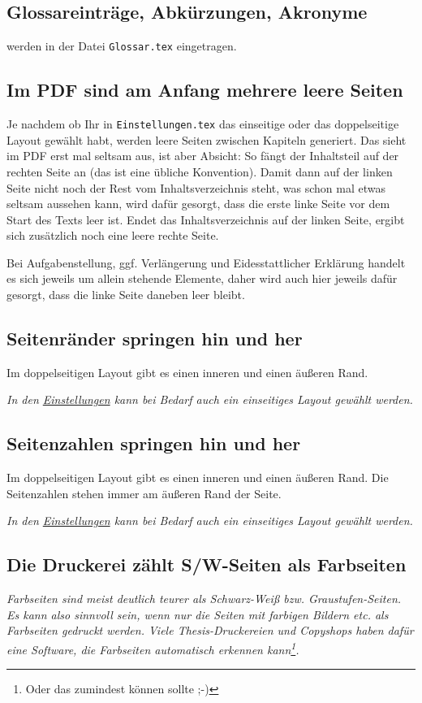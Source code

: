 		\subsection{Glossareinträge, Abkürzungen, Akronyme}
			werden in der Datei \lstinline|Glossar.tex| eingetragen.
		
		\subsection{Im PDF sind am Anfang mehrere leere Seiten}
			Je nachdem ob Ihr in \lstinline|Einstellungen.tex| das einseitige oder das doppelseitige Layout gewählt habt, werden leere Seiten zwischen Kapiteln generiert.
			Das sieht im PDF erst mal seltsam aus, ist aber Absicht:
			So fängt \zb{} der Inhaltsteil auf der rechten Seite an (das ist eine übliche Konvention).
			Damit dann auf der linken Seite nicht noch der Rest vom Inhaltsverzeichnis steht, was schon mal etwas seltsam aussehen kann, wird dafür gesorgt, dass die erste linke Seite vor dem Start des Texts leer ist. Endet das Inhaltsverzeichnis auf der linken Seite, ergibt sich zusätzlich noch eine leere rechte Seite.
			
			Bei Aufgabenstellung, ggf. Verlängerung und Eidesstattlicher Erklärung handelt es sich jeweils um allein stehende Elemente, daher wird auch hier jeweils dafür gesorgt, dass die linke Seite daneben leer bleibt.
		
		\subsection{Seitenränder springen hin und her}
			Im doppelseitigen Layout gibt es einen inneren und einen äußeren Rand.
			\medskip
			
			\textit{In den \hyperref[FAQ:Einstellungen]{Einstellungen} kann bei Bedarf auch ein einseitiges Layout gewählt werden.}
		
		\subsection{Seitenzahlen springen hin und her}
			Im doppelseitigen Layout gibt es einen inneren und einen äußeren Rand.
			Die Seitenzahlen stehen immer am äußeren Rand der Seite.
			\medskip
			
			\textit{In den \hyperref[FAQ:Einstellungen]{Einstellungen} kann bei Bedarf auch ein einseitiges Layout gewählt werden.}
			
		\subsection{Die Druckerei zählt S/W-Seiten als Farbseiten}
			\textit{Farbseiten sind meist deutlich teurer als Schwarz-Weiß bzw. Graustufen-Seiten.
			Es kann also sinnvoll sein, wenn nur die Seiten mit farbigen Bildern etc. als Farbseiten gedruckt werden. Viele Thesis-Druckereien und Copyshops haben dafür eine Software, die Farbseiten automatisch erkennen kann\footnote{Oder das zumindest können sollte ;-)}.}
			
